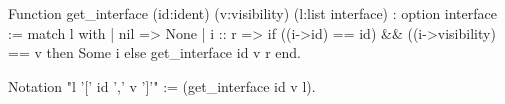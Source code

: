 Function get_interface (id:ident) (v:visibility) 
           (l:list interface) : option interface :=
    match l with
      | nil    => None
      | i :: r => if ((i->id) == id) && ((i->visibility) == v then 
	                    Some i  
		              else 
		                  get_interface id v r
    end.

Notation "l '[' id ',' v ']'" := (get_interface id v l).
